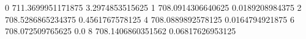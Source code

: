 0 711.3699951171875 3.2974853515625
1 708.0914306640625 0.0189208984375
2 708.5286865234375 0.4561767578125
4 708.0889892578125 0.0164794921875
6 708.072509765625 0.0
8 708.1406860351562 0.06817626953125
